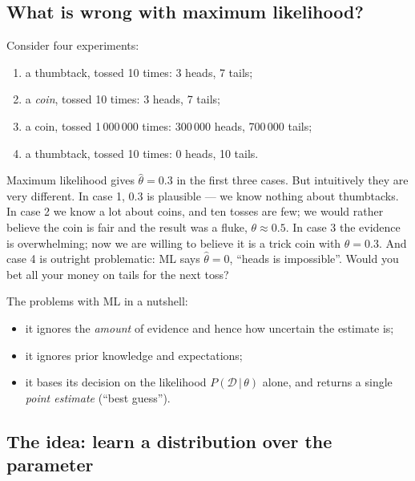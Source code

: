 \documentclass[11pt, oneside]{book}
\newcommand{\Prob}{\mathbb{P}}           %
\newcommand{\dataset}{\mathcal{D}}       %
\newcommand{\given}{\,\vert\,}           %
\let\originalsubsection\subsection
\renewcommand{\subsection}{\Needspace{6\baselineskip}\originalsubsection}
\begin{document}
\subsection{What is wrong with maximum likelihood?}

Consider four experiments:
\begin{enumerate}
  \item a thumbtack, tossed 10 times: 3 heads, 7 tails;
  \item a \emph{coin}, tossed 10 times: 3 heads, 7 tails;
  \item a coin, tossed 1\,000\,000 times: 300\,000 heads, 700\,000 tails;
  \item a thumbtack, tossed 10 times: 0 heads, 10 tails.
\end{enumerate}
Maximum likelihood gives $\hat\theta = 0.3$ in the first three cases. But
intuitively they are very different. In case 1, $0.3$ is plausible --- we
know nothing about thumbtacks. In case 2 we know a lot about coins, and ten
tosses are few; we would rather believe the coin is fair and the result was a
fluke, $\theta \approx 0.5$. In case 3 the evidence is overwhelming; now we
are willing to believe it is a trick coin with $\theta = 0.3$. And case 4 is
outright problematic: ML says $\hat\theta = 0$, ``heads is impossible''. Would
you bet all your money on tails for the next toss?

The problems with ML in a nutshell:
\begin{itemize}
  \item it ignores the \emph{amount} of evidence and hence how uncertain the
    estimate is;
  \item it ignores prior knowledge and expectations;
  \item it bases its decision on the likelihood $P(\dataset \given \theta)$
    alone, and returns a single \emph{point estimate} (``best guess'').
\end{itemize}

\subsection{The idea: learn a distribution over the parameter}
\end{document}
